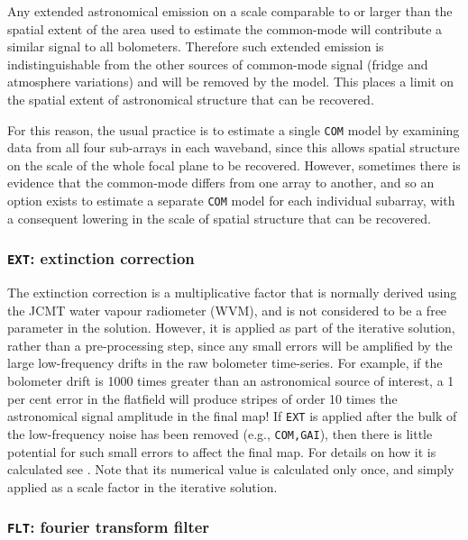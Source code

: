 \documentclass[useAMS,usenatbib,nofootinbib]{mn2e}
\newcommand{\model}[1]{\texttt{#1}}
\begin{document}
Any extended astronomical emission on a scale comparable to or larger
than the spatial extent of the area used to estimate the common-mode will
contribute a similar signal to all bolometers. Therefore such extended
emission is indistinguishable from the other sources of common-mode
signal (fridge and atmosphere variations) and will be removed by the
model. This places a limit on the spatial extent of astronomical
structure that can be recovered.

For this reason, the usual practice is to estimate a single
\model{COM} model by examining data from all four sub-arrays in each
waveband, since this allows spatial structure on the scale of the
whole focal plane to be recovered. However, sometimes there is
evidence that the common-mode differs from one array to another, and
so an option exists to estimate a separate \model{COM} model for each
individual subarray, with a consequent lowering in the scale of
spatial structure that can be recovered.

\subsubsection{\model{EXT}: extinction correction}
\label{sec:ext}

The extinction correction is a multiplicative factor that is normally
derived using the JCMT water vapour radiometer (WVM), and is not
considered to be a free parameter in the solution. However, it is
applied as part of the iterative solution, rather than a
pre-processing step, since any small errors will be amplified by the
large low-frequency drifts in the raw bolometer time-series. For
example, if the bolometer drift is 1000 times greater than an
astronomical source of interest, a 1 per cent error in the flatfield
will produce stripes of order 10 times the astronomical signal
amplitude in the final map! If \model{EXT} is applied after the bulk
of the low-frequency noise has been removed (e.g., \model{COM,GAI}),
then there is little potential for such small errors to affect the
final map.  For details on how it is calculated see
\citet{dempsey2012}. Note that its numerical value is calculated only
once, and simply applied as a scale factor in the iterative solution.

\subsubsection{\model{FLT}: fourier transform filter}
\label{sec:flt}
\end{document}
